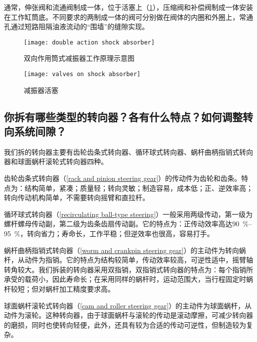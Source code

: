 \documentclass[UTF8]{ctexart}
\numberwithin{figure}{section}
\numberwithin{table}{section}
\begin{document}
通常，伸张阀和流通阀制成一体，位于活塞上（\cref{valves on shock absorber}），压缩阀和补偿阀制成一体安装在工作缸筒底。不同要求的两制成一体的阀可分别做在阀体的内圈和外圈上，常通孔通过短路阻隔油液流动的“围墙”的缝隙实现。

\begin{figure}[htbp]
	\centering
	\begin{minipage}[b]{0.3\textwidth}
		\centering
		\texttt{[image: double action shock absorber]}
		\caption{双向作用筒式减振器工作原理示意图}
		\label{double action shock absorber}
	\end{minipage}
	\begin{minipage}[b]{0.6\textwidth}
		\centering
		\texttt{[image: valves on shock absorber]}
		\caption{减振器活塞}
		\label{valves on shock absorber}
	\end{minipage}
\end{figure}

\subsection{你拆有哪些类型的转向器？各有什么特点？如何调整转向系统间隙？}

我们拆的转向器主要有齿轮齿条式转向器、循环球式转向器、蜗杆曲柄指销式转向器和球面蜗杆滚轮式转向器四种。

齿轮齿条式转向器（\cref{rack and pinion steering gear}）的传动件为齿轮和齿条。特点为：结构简单，紧凑；质量轻；转向灵敏；制造容易，成本低；正、逆效率高；转向传动机构简单，不需要转向摇臂和直拉杆。

循环球式转向器（\cref{recirculating ball-type steering}）一般采用两级传动，第一级为螺杆螺母传动副，第二级为齿条齿扇传动副。它的特点为：正传动效率高达\qtyrange[range-phrase = $\,\sim\,$, range-units = single]{90}{95}{\percent}，转向省力；寿命长，工作平稳；但逆效率也很高，容易打手。

蜗杆曲柄指销式转向器（\cref{worm and crankpin steering gear}）的主动件为转向蜗杆，从动件为指销。它的特点为结构较简单，传动效率较高，可逆性适中，摇臂轴转角较大。我们拆装的转向器采用双指销，双指销式转向器的特点为：每个指销所承受的载荷小，因此寿命长；在采用同样的蜗杆时，运动范围大，当行程固定时蜗杆较短；但对蜗杆加工精度要求高。

球面蜗杆滚轮式转向器（\cref{cam and roller steering gear}）的主动件为球面蜗杆，从动件为滚轮。这种转向器，由于球面蜗杆与滚轮的传动是滚动摩擦，可减少转向器的磨损，同时也使转向轻便，此外，还具有较为合适的传动可逆性，但制造较为复杂。
\end{document}
